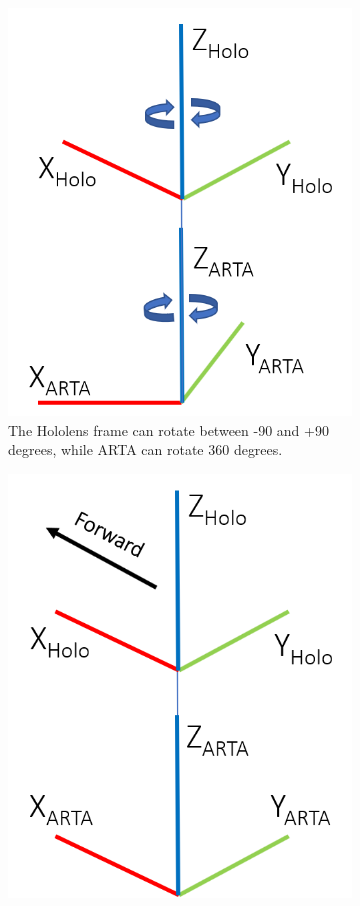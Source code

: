 \begin{figure}[ht]
    \begin{subfigure}[b]{.45\textwidth}
        \centering
        \includegraphics[width=0.75\linewidth]{img/chapter5_implementation/holoArtaFrames.png}
        \caption{The Hololens frame can rotate between -90 and +90 degrees, while ARTA can rotate 360 degrees.}
    \end{subfigure}%
    \hspace{\fill} 
    \begin{subfigure}[b]{.45\textwidth}
        \centering
        \includegraphics[width=0.75\linewidth]{img/chapter5_implementation/holoArtaFramesAligned.png}

\end{subfigure}
\end{figure}
